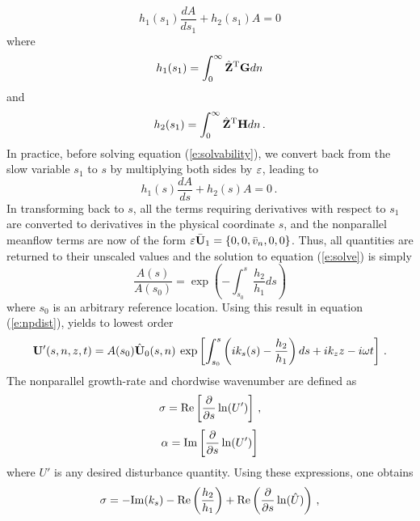 %
\begin{equation} \label{e:solvability}
  h_1(s_1) \frac{dA}{ds_1} + h_2(s_1) A = 0
\end{equation}
%
where
\begin{equation}
  h_1(s_1) = \int_0^\infty {\hat{\bf Z}}^{\rm T} {\bf G} dn
\end{equation}
%
and
%
\begin{equation}
  h_2(s_1) = \int_0^\infty {\hat{\bf Z}}^{\rm T} {\bf H} dn {\, .}
\end{equation}
%
In practice, before solving equation (\ref{e:solvability}), we convert back
from the slow variable $s_1$ to $s$ by multiplying both sides by $\varepsilon$,
leading to
%
\begin{equation} \label{e:solve}
  h_1(s) \frac{dA}{ds} + h_2(s) A = 0 \period
\end{equation}
%
In transforming back to $s$, all the terms requiring derivatives with respect
to $s_1$ are converted to derivatives in the physical coordinate $s$, and the
nonparallel meanflow terms are now of the form $\varepsilon\bar{{\bf U}}_1 = \{0,0,\bar
v_n,0,0\}$.  Thus, all quantities are returned to their unscaled values and
the solution to equation (\ref{e:solve}) is simply
%
\begin{equation}
  \frac{A(s)}{A(s_0)} = \exp\left( -\int_{s_0}^{s} \frac{h_2}{h_1} ds \right)
\end{equation}
%
where $s_0$ is an arbitrary  reference location.  Using this result in equation
(\ref{e:npdist}), yields to lowest order
%
\begin{equation}
  {\bf U}'(s,n,z,t) = A(s_0) {\hat{\bf U}}_0(s,n) \: \exp\left[  \int_{s_0}^s 
                  \left(i k_s(s) - \frac{h_2}{h_1} \right) ds +
                  i k_z z - i \omega t \right] {\, .}
\end{equation}
%
The nonparallel growth-rate and chordwise wavenumber are defined as
%
\begin{equation}
  \sigma = {\rm Re} \left[ \frac{\partial}{\partial s} \ln( U' ) \right] {\, ,}
\end{equation}
%
\begin{equation}
  \alpha = {\rm Im} \left[ \frac{\partial}{\partial s} \ln( U' ) \right]
\end{equation}
%
where $U'$ is any desired disturbance quantity.  Using these expressions, one
obtains
%
\begin{equation} \label{e:NPsigma}
  \sigma = -{\rm Im}( k_s ) - {\rm Re}\left(\frac{h_2}{h_1}\right) +
            {\rm Re}\left( \frac{\partial}{\partial s} \ln (\hat U) \right)
  {\, ,}
\end{equation}
